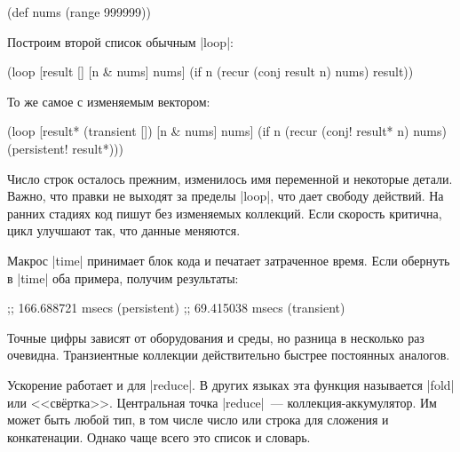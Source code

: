 \begin{english}
  \begin{clojure}
(def nums (range 999999))
  \end{clojure}
\end{english}


\noindent
Построим второй список обычным \spverb|loop|:

\begin{english}
  \begin{clojure}
(loop [result []
       [n & nums] nums]
  (if n
    (recur (conj result n) nums)
    result))
  \end{clojure}
\end{english}

\noindent
То же самое с изменяемым вектором:

\begin{english}
  \begin{clojure}
(loop [result* (transient [])
       [n & nums] nums]
  (if n
    (recur (conj! result* n) nums)
    (persistent! result*)))
  \end{clojure}
\end{english}

Число строк осталось прежним, изменилось имя переменной и некоторые
детали. Важно, что правки не выходят за пределы \spverb|loop|, что дает свободу
действий. На ранних стадиях код пишут без изменяемых коллекций. Если скорость
критична, цикл улучшают так, что данные меняются.

Макрос \spverb|time| принимает блок кода и печатает затраченное время. Если
обернуть в \spverb|time| оба примера, получим результаты:

\begin{english}
  \begin{text}
;; 166.688721 msecs (persistent)
;;  69.415038 msecs (transient)
  \end{text}
\end{english}

Точные цифры зависят от оборудования и среды, но разница в несколько раз
очевидна. Транзиентные коллекции действительно быстрее постоянных аналогов.


Ускорение работает и для \spverb|reduce|. В других языках эта функция называется
\spverb|fold| или <<св\"{е}ртка>>. Центральная точка \spverb|reduce|~---
коллекция-аккумулятор. Им может быть любой тип, в том числе число или строка для
сложения и конкатенации. Однако чаще всего это список и словарь.

